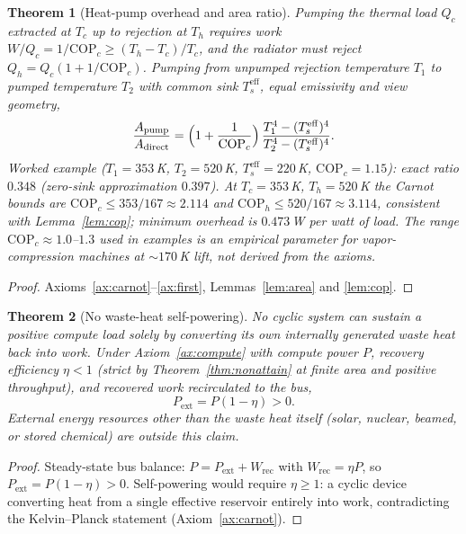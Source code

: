 \documentclass[11pt]{article}
\newtheorem{theorem}{Theorem}
\theoremstyle{definition}
\theoremstyle{remark}
\newcommand{\Th}{T_h}
\newcommand{\Tc}{T_c}
\newcommand{\Ts}{T_s^{\mathrm{eff}}}
\begin{document}
\begin{theorem}[Heat-pump overhead and area ratio]\label{thm:pump}
Pumping the thermal load $Q_{c}$ extracted at $\Tc$ up to rejection at $\Th$ requires work
$W/Q_{c}=1/\mathrm{COP}_{c}\ge(\Th-\Tc)/\Tc$, and the radiator must reject $Q_{h}=Q_{c}(1+1/\mathrm{COP}_{c})$. Pumping from unpumped rejection temperature $T_{1}$ to pumped temperature $T_{2}$ with common sink $\Ts$, equal emissivity and view geometry,
\begin{equation}
\frac{A_{\mathrm{pump}}}{A_{\mathrm{direct}}}
=\Bigl(1+\frac{1}{\mathrm{COP}_{c}}\Bigr)\,
\frac{T_{1}^{4}-(\Ts)^{4}}{T_{2}^{4}-(\Ts)^{4}}.
\end{equation}
\emph{Worked example} ($T_{1}=353$\,K, $T_{2}=520$\,K, $\Ts=220$\,K, $\mathrm{COP}_{c}=1.15$): exact ratio $0.348$ (zero-sink approximation $0.397$). At $\Tc=353$\,K, $\Th=520$\,K the Carnot bounds are $\mathrm{COP}_{c}\le353/167\approx2.114$ and $\mathrm{COP}_{h}\le520/167\approx3.114$, consistent with Lemma~\ref{lem:cop}; minimum overhead is $0.473$\,W per watt of load. The range $\mathrm{COP}_{c}\approx1.0$--$1.3$ used in examples is an empirical parameter for vapor-compression machines at ${\sim}170\,$K lift, not derived from the axioms.
\end{theorem}

\begin{proof}
Axioms~\ref{ax:carnot}--\ref{ax:first}, Lemmas~\ref{lem:area} and \ref{lem:cop}.
\end{proof}

\begin{theorem}[No waste-heat self-powering]\label{thm:selfpower}
No cyclic system can sustain a positive compute load solely by converting its own internally generated waste heat back into work. Under Axiom~\ref{ax:compute} with compute power $P$, recovery efficiency $\eta<1$ (strict by Theorem~\ref{thm:nonattain} at finite area and positive throughput), and recovered work recirculated to the bus,
\begin{equation}
P_{\mathrm{ext}}=P(1-\eta)>0 .
\end{equation}
External energy resources other than the waste heat itself (solar, nuclear, beamed, or stored chemical) are outside this claim.
\end{theorem}

\begin{proof}
Steady-state bus balance: $P=P_{\mathrm{ext}}+W_{\mathrm{rec}}$ with $W_{\mathrm{rec}}=\eta P$, so $P_{\mathrm{ext}}=P(1-\eta)>0$. Self-powering would require $\eta\ge1$: a cyclic device converting heat from a single effective reservoir entirely into work, contradicting the Kelvin--Planck statement (Axiom~\ref{ax:carnot}).
\end{proof}
\end{document}
